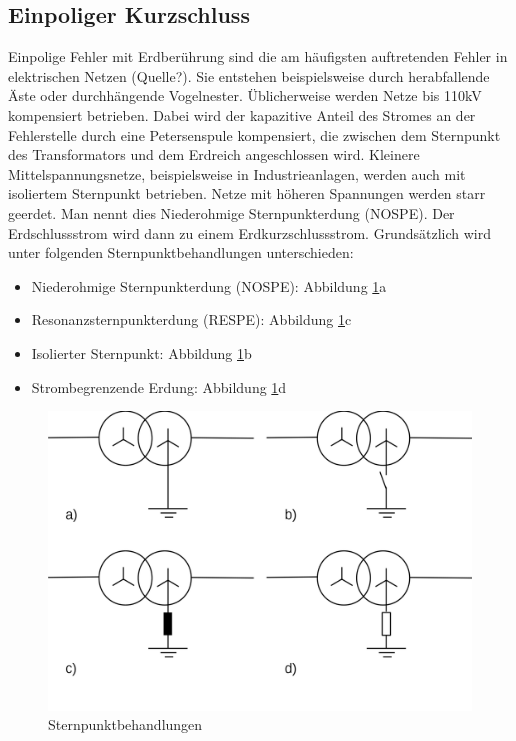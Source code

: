 \documentclass{scrartcl}
\begin{document}
\begin{onehalfspace}
\subsection{Einpoliger Kurzschluss}
Einpolige Fehler mit Erdberührung sind die am häufigsten auftretenden Fehler in elektrischen Netzen (Quelle?). Sie entstehen beispielsweise durch herabfallende Äste oder durchhängende Vogelnester. Üblicherweise werden Netze bis 110kV kompensiert betrieben. Dabei wird der kapazitive Anteil des Stromes an der Fehlerstelle durch eine Petersenspule kompensiert, die zwischen dem Sternpunkt des Transformators und dem Erdreich angeschlossen wird. Kleinere Mittelspannungsnetze, beispielsweise in Industrieanlagen, werden auch mit isoliertem Sternpunkt betrieben. Netze mit höheren Spannungen werden starr geerdet. Man nennt dies \glqq Niederohmige Sternpunkterdung\grqq{} (NOSPE). Der Erdschlussstrom wird dann zu einem Erdkurzschlussstrom. Grundsätzlich wird unter folgenden Sternpunktbehandlungen unterschieden:

\begin{itemize}
\item Niederohmige Sternpunkterdung (NOSPE): Abbildung \ref{sternpunktbehandlung}a
\item Resonanzsternpunkterdung (RESPE): Abbildung \ref{sternpunktbehandlung}c
\item Isolierter Sternpunkt: Abbildung \ref{sternpunktbehandlung}b
\item Strombegrenzende Erdung: Abbildung \ref{sternpunktbehandlung}d
\end{itemize}

	\begin{figure}[H]
	\centering
	\includegraphics[scale=0.3]{img/sternpunktbehandlung.png}
	\caption{Sternpunktbehandlungen}
	\label{sternpunktbehandlung}
	\end{figure}


\end{onehalfspace}
\end{document}

